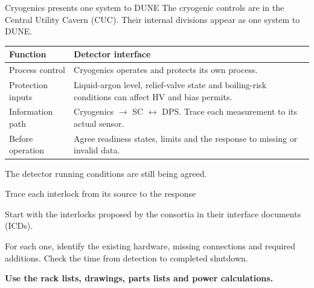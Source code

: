 \documentclass[aspectratio=169,11pt]{beamer}
\begin{document}
\begin{frame}{Cryogenics presents one system to DUNE}
The cryogenic controls are in the Central Utility Cavern (CUC).
Their internal divisions appear as one system to DUNE.\par\bigskip
\renewcommand{\arraystretch}{1.3}
\begin{tabularx}{\textwidth}{@{}>{\RaggedRight\arraybackslash}p{3cm}>{\RaggedRight\arraybackslash}X@{}}
\toprule
\textbf{Function} & \textbf{Detector interface}\\\midrule
Process control & Cryogenics operates and protects its own process.\\
Protection inputs & Liquid-argon level, relief-valve state and boiling-risk conditions can affect HV and bias permits.\\
Information path & Cryogenics $\rightarrow$ SC $\leftrightarrow$ DPS. Trace each measurement to its actual sensor.\\
Before operation & Agree readiness states, limits and the response to missing or invalid data.\\
\bottomrule
\end{tabularx}\par\medskip
The detector running conditions are still being agreed.
\end{frame}

\begin{frame}{Trace each interlock from its source to the response}
\centering
{}\par\medskip
\raggedright{}\par\medskip
\raggedright

Start with the interlocks proposed by the consortia in their interface documents (ICDs).\par\bigskip
For each one, identify the existing hardware, missing connections and required additions. Check the time from detection to completed shutdown.\par\bigskip
\textbf{Use the rack lists, drawings, parts lists and power calculations.}
\end{frame}
\end{document}
